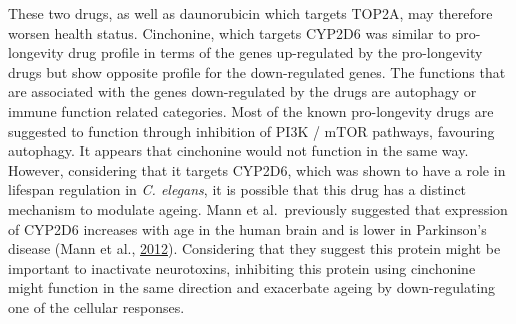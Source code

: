 \documentclass[12pt,twoside]{unicam}
\begin{document}
These two drugs, as well as daunorubicin which targets TOP2A, may therefore worsen health status. Cinchonine, which targets CYP2D6 was similar to pro-longevity drug profile in terms of the genes up-regulated by the pro-longevity drugs but show opposite profile for the down-regulated genes. The functions that are associated with the genes down-regulated by the drugs are autophagy or immune function related categories. Most of the known pro-longevity drugs are suggested to function through inhibition of PI3K / mTOR pathways, favouring autophagy. It appears that cinchonine would not function in the same way. However, considering that it targets CYP2D6, which was shown to have a role in lifespan regulation in \emph{C. elegans}, it is possible that this drug has a distinct mechanism to modulate ageing. Mann et al.~previously suggested that expression of CYP2D6 increases with age in the human brain and is lower in Parkinson's disease (Mann et al., \protect\hyperlink{ref-Mann2012}{2012}). Considering that they suggest this protein might be important to inactivate neurotoxins, inhibiting this protein using cinchonine might function in the same direction and exacerbate ageing by down-regulating one of the cellular responses.
\end{document}
